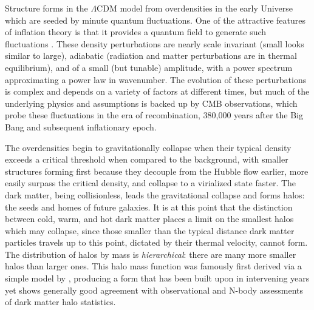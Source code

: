 Structure forms in the $\Lambda$CDM model from overdensities in the early Universe which are seeded by minute quantum fluctuations. One of the attractive features of inflation theory is that it provides a quantum field to generate such fluctuations \parencite{hawking82,guth82,starobinsky82}. These density perturbations are nearly scale invariant (small looks similar to large), adiabatic (radiation and matter perturbations are in thermal equilibrium), and of a small (but tunable) amplitude, with a power spectrum approximating a power law in wavenumber. The evolution of these perturbations is complex and depends on a variety of factors at different times, but much of the underlying physics and assumptions is backed up by CMB observations, which probe these fluctuations in the era of recombination, 380,000 years after the Big Bang and subsequent inflationary epoch.

The overdensities begin to gravitationally collapse when their typical density exceeds a critical threshold when compared to the background, with smaller structures forming first because they decouple from the Hubble flow earlier, more easily surpass the critical density, and collapse to a virialized state faster. The dark matter, being collisionless, leads the gravitational collapse and forms halos: the seeds and homes of future galaxies. It is at this point that the distinction between cold, warm, and hot dark matter places a limit on the smallest halos which may collapse, since those smaller than the typical distance dark matter particles travels up to this point, dictated by their thermal velocity, cannot form. The distribution of halos by mass is \textit{hierarchical}: there are many more smaller halos than larger ones. This halo mass function was famously first derived via a simple model by \textcite{press74}, producing a form that has been built upon in intervening years \parencite{bond91,sheth99,sheth01} yet shows generally good agreement with observational and N-body assessments of dark matter halo statistics.

